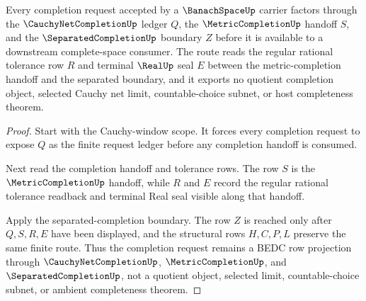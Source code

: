 \begin{theorem}
\label{thm:banach-space-cauchy-net-separated-completion-route}
Every completion request accepted by a $\BanachSpaceUp$ carrier factors through the $\CauchyNetCompletionUp$ ledger $Q$, the $\MetricCompletionUp$ handoff $S$, and the $\SeparatedCompletionUp$ boundary $Z$ before it is available to a downstream complete-space consumer. The route reads the regular rational tolerance row $R$ and terminal $\RealUp$ seal $E$ between the metric-completion handoff and the separated boundary, and it exports no quotient completion object, selected Cauchy net limit, countable-choice subnet, or host completeness theorem.
\end{theorem}
\begin{proof}
Start with the Cauchy-window scope. It forces every completion request to expose $Q$ as the finite request ledger before any completion handoff is consumed.

Next read the completion handoff and tolerance rows. The row $S$ is the $\MetricCompletionUp$ handoff, while $R$ and $E$ record the regular rational tolerance readback and terminal Real seal visible along that handoff.

Apply the separated-completion boundary. The row $Z$ is reached only after $Q,S,R,E$ have been displayed, and the structural rows $H,C,P,L$ preserve the same finite route. Thus the completion request remains a BEDC row projection through $\CauchyNetCompletionUp$, $\MetricCompletionUp$, and $\SeparatedCompletionUp$, not a quotient object, selected limit, countable-choice subnet, or ambient completeness theorem.
\end{proof}

